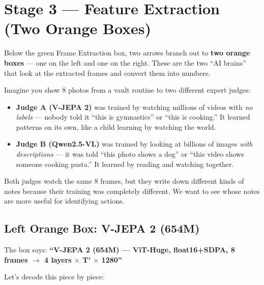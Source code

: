 \documentclass[12pt, a4paper]{article}
\begin{document}
\newpage
\section{Stage 3 — Feature Extraction (Two Orange Boxes)}

Below the green Frame Extraction box, two arrows branch out to \textbf{two orange boxes} — one on the left and one on the right. These are the two ``AI brains'' that look at the extracted frames and convert them into numbers.

\begin{analogybox}
Imagine you show 8 photos from a vault routine to two different expert judges:
\begin{itemize}
    \item \textbf{Judge A (V-JEPA 2)} was trained by watching millions of videos with \textit{no labels} — nobody told it ``this is gymnastics'' or ``this is cooking.'' It learned patterns on its own, like a child learning by watching the world.
    \item \textbf{Judge B (Qwen2.5-VL)} was trained by looking at billions of images \textit{with descriptions} — it was told ``this photo shows a dog'' or ``this video shows someone cooking pasta.'' It learned by reading and watching together.
\end{itemize}
Both judges watch the same 8 frames, but they write down different kinds of notes because their training was completely different. We want to see whose notes are more useful for identifying actions.
\end{analogybox}

\subsection{Left Orange Box: V-JEPA 2 (654M)}

The box says: \textbf{``V-JEPA 2 (654M) — ViT-Huge, float16+SDPA, 8 frames $\rightarrow$ 4 layers $\times$ T' $\times$ 1280''}

Let's decode this piece by piece:
\end{document}
